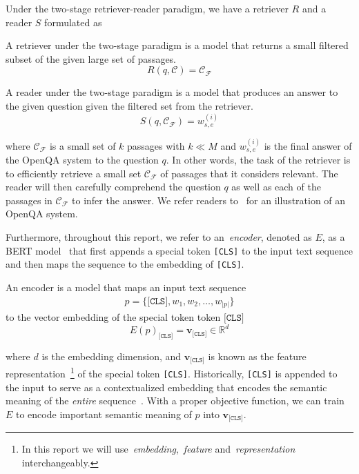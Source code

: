 %
Under the two-stage retriever-reader paradigm, we have a retriever $R$ and a reader $S$ formulated as
%
\begin{definition}[Retriever]
	A retriever under the two-stage paradigm is a model that returns a small filtered subset of the given large set of passages.
	\begin{equation}
	R(q, \mathcal{C}) = \mathcal{C_F}
	\end{equation}
\end{definition}
%
\begin{definition}[Reader]
	A reader under the two-stage paradigm is a model that produces an answer to the given question given the filtered set from the retriever.
	\begin{equation}
	S(q, \mathcal{C_F}) = w_{s, e}^{(i)}
	\end{equation}
\end{definition}
%
where $\mathcal{C_F}$ is a small set of $k$ passages with $k \ll M$ and $w_{s, e}^{(i)}$ is the final answer of the OpenQA system to the question $q$.
%
In other words, the task of the retriever is to efficiently retrieve a small set $\mathcal{C_F}$ of passages that it considers relevant.
%
The reader will then carefully comprehend the question $q$ as well as each of the passages in $\mathcal{C_F}$ to infer the answer.
%
We refer readers to~ for an illustration of an OpenQA system.

Furthermore, throughout this report, we refer to an~\emph{encoder}, denoted as $E$, as a BERT model~\cite{devlin2019bert} that first appends a special token \texttt{[CLS]} to the input text sequence and then maps the sequence to the embedding of \texttt{[CLS]}.
\begin{definition}[Encoder]
	An encoder is a model that maps an input text sequence
	\begin{align*}
	p = \{\texttt{[CLS]}, w_1, w_2, \ldots, w_{\vert p \vert}\}
	\end{align*}
	to the vector embedding of the special token token $\texttt{[CLS]}$
	\begin{equation}
	E(p)_{\texttt{[CLS]}} = \mathbf{v}_{\texttt{[CLS]}} \in \mathbb{R}^{d}
	\end{equation}
\end{definition}
%
where $d$ is the embedding dimension, and $\mathbf{v}_{\texttt{[CLS]}}$ is known as the feature representation~\footnote{In this report we will use~\emph{embedding},~\emph{feature} and~\emph{representation} interchangeably.} of the special token \texttt{[CLS]}.
%
Historically, \texttt{[CLS]} is appended to the input to serve as a contextualized embedding that encodes the semantic meaning of the \emph{entire} sequence~\cite{devlin2019bert}.
%
With a proper objective function, we can train $E$ to encode important semantic meaning of $p$ into $\mathbf{v}_{\texttt{[CLS]}}$.




